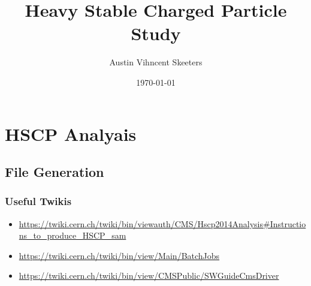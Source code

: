 \documentclass[11pt]{article}
\author{Austin Vihncent Skeeters}
\date{\today}
\title{Heavy Stable Charged Particle Study}
\begin{document}
\maketitle
\tableofcontents


\section{HSCP Analyais}
\label{sec-1}
\subsection{File Generation}
\label{sec-1-1}
\subsubsection{Useful Twikis}
\label{sec-1-1-1}
\begin{itemize}
\item \url{https://twiki.cern.ch/twiki/bin/viewauth/CMS/Hscp2014Analysis#Instructions_to_produce_HSCP_sam}
\item \url{https://twiki.cern.ch/twiki/bin/view/Main/BatchJobs}
\item \url{https://twiki.cern.ch/twiki/bin/view/CMSPublic/SWGuideCmsDriver}
\end{itemize}
\end{document}

